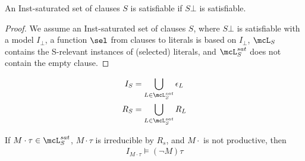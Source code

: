 \begin{theorem}
    An Inst-saturated set of clauses $S$ is satisfiable if $S\bot$ is satisfiable.
\end{theorem}



\begin{proof}
    We assume an Inst-saturated set of clauses $S$,
    where $S\bot$ is satisfiable with a model $I_\bot$,
    a function $\sel$ from clauses to literals is based on $I_\bot$,
    $\mcL_S$ contains the S-relevant instances of (selected) literals,
    and $\mcL_S^{sat}$ does not contain the empty clause.



\end{proof}

\begin{align*}
    I_S &= \bigcup_{L\in\mcL_S^{sat}} \epsilon_L
    \\
    R_S &= \bigcup_{L\in\mcL_S^{sat}} R_L
\end{align*}

\begin{lemma}
    If $M\cdot\tau \in \mcL_S^{sat}$,
    $M\cdot\tau$ is irreducible by $R_s$,
    and $M\cdot$ is not productive, then
    \begin{gather}
        I_{M\cdot\tau} \models (\lnot M)\tau
    \end{gather}
\end{lemma}



